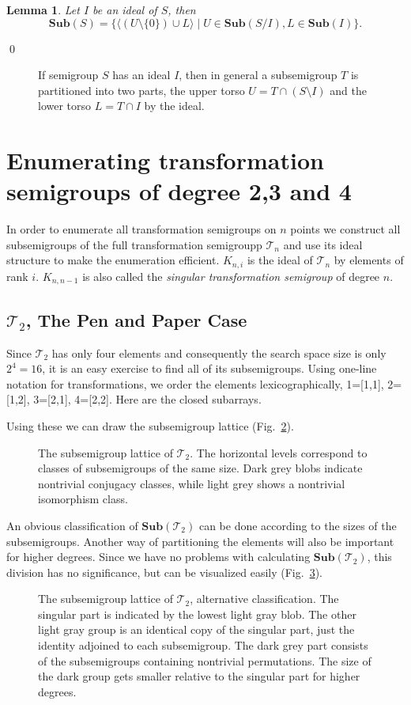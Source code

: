 \documentclass{amsart}
\newcommand{\cT}{{\mathcal T}}
\newcommand{\Sub}{\mathbf{Sub}}
\theoremstyle{plain}
\newtheorem{lemma}[theorem]{Lemma}
\theoremstyle{definition}
\begin{document}
\begin{lemma}
Let $I$ be an ideal of $S$, then $$\Sub(S)=\big\{\langle (U\setminus\{0\})\cup L \rangle\mid U\in \Sub(S/I), L\in\Sub(I)\big\}.$$
\end{lemma}
\proof
\qed

\begin{figure}
\begin{center}

\caption{If semigroup $S$ has an ideal $I$, then in general a subsemigroup $T$ is partitioned into two parts, the upper torso $U=T\cap (S\setminus I)$ and the lower torso $L=T\cap I$ by the ideal.}
\label{fig:torsos}
\end{center}
\end{figure}
\section{Enumerating transformation semigroups of degree 2,3 and 4}
\label{sec:fulltranssgp}
In order to enumerate all transformation semigroups on $n$ points we construct all subsemigroups of the full transformation semigroupp $\cT_n$ and use its ideal structure to make the enumeration efficient.
$K_{n,i}$ is the ideal of $\cT_n$ by elements of rank $i$.
$K_{n,n-1}$ is also called the \emph{singular transformation semigroup} of degree $n$.

\subsection{$\cT_2$, The Pen and Paper Case}
Since $\cT_2$ has only four elements and consequently the search space size is only $2^4=16$, it is an easy exercise to find all of its subsemigroups. 
Using one-line notation for transformations, we order the elements lexicographically, 1=[1,1], 2=[1,2], 3=[2,1], 4=[2,2]. Here are the closed subarrays.

Using these we can draw the subsemigroup lattice (Fig.\ \ref{fig:T2subs}).
\begin{figure}

\caption{The subsemigroup lattice of $\cT_2$. The horizontal levels correspond to classes of subsemigroups of the same size.  Dark grey blobs indicate nontrivial conjugacy classes, while light grey shows a nontrivial isomorphism class.}
\label{fig:T2subs}
\end{figure}
An obvious classification of $\Sub(\cT_2)$ can be done according to the sizes of the subsemigroups.
Another way of partitioning the elements will also be important for higher degrees. Since we have no problems with calculating $\Sub(\cT_2)$, this division has no significance, but can be visualized easily (Fig.\ \ref{fig:T2subsAlt}).
\begin{figure}

\caption{The subsemigroup lattice of $\cT_2$, alternative classification. The singular part is indicated by the lowest light gray blob. The other light gray group is an identical copy of the singular part, just the identity adjoined to each subsemigroup. The dark grey part consists of the subsemigroups containing nontrivial permutations. The size of the dark group gets smaller relative to the singular part for higher degrees.}
\label{fig:T2subsAlt}
\end{figure}
\end{document}
